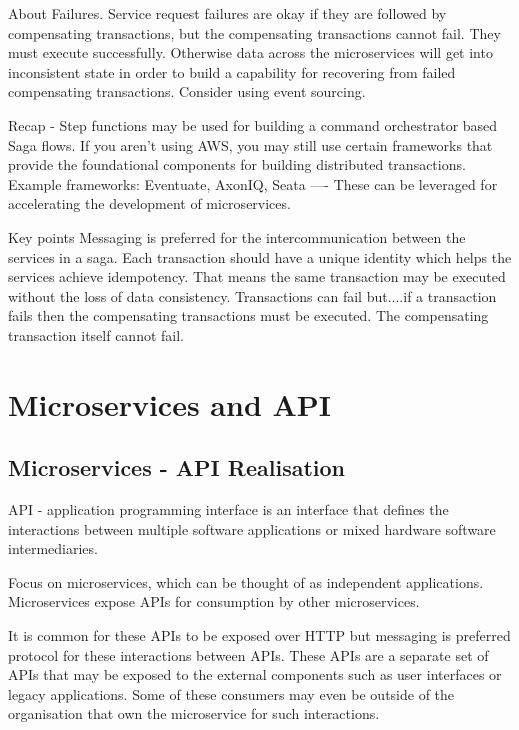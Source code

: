 \documentclass[a4paper, 11pt]{book}
\begin{document}
    About Failures.
    Service request failures are okay if they are followed by compensating transactions, but the compensating transactions cannot fail.
    They must execute successfully.
    Otherwise data across the microservices will get into inconsistent state in order to build a capability for recovering from failed compensating transactions.
    Consider using event sourcing.

    Recap - Step functions may be used for building a command orchestrator based Saga flows.
    If you aren't using AWS, you may still use certain frameworks that provide the foundational components for building distributed transactions.
    Example frameworks: Eventuate, AxonIQ, Seata ---- These can be leveraged for accelerating the development of microservices.

    Key points
    Messaging is preferred for the intercommunication between the services in a saga.
    Each transaction should have a unique identity which helps the services achieve idempotency.
    That means the same transaction may be executed without the loss of data consistency.
    Transactions can fail but....if a transaction fails then the compensating transactions must be executed.
    The compensating transaction itself cannot fail.



    \chapter{Microservices and API}


    \section{Microservices - API Realisation}
    API - application programming interface is an interface that defines the interactions between multiple software applications or mixed hardware software intermediaries.

    Focus on microservices, which can be thought of as independent applications.
    Microservices expose APIs for consumption by other microservices.

    It is common for these APIs to be exposed over HTTP but messaging is preferred protocol for these interactions between APIs.
    These APIs are a separate set of APIs that may be exposed to the external components such as user interfaces or legacy applications.
    Some of these consumers may even be outside of the organisation that own the microservice for such interactions.
\end{document}
